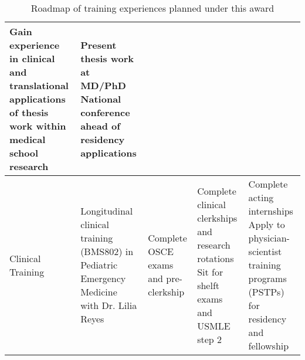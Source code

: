 \begin{table}[h]
\begin{tabularx}{\textwidth}{|l|X|X|X|X|}
    Gain experience in clinical and translational applications of thesis work within medical school research &
    Present thesis work at MD/PhD National conference ahead of residency applications \\
    \hline
    Clinical Training &
    Longitudinal clinical training (BMS802) in Pediatric Emergency Medicine with Dr. Lilia Reyes &
    Complete OSCE exams and pre-clerkship &
    Complete clinical clerkships and research rotations \newline
    Sit for shelft exams and USMLE step 2 &
    Complete acting internships \newline Apply to physician-scientist training programs (PSTPs) for residency and fellowship\\
  \hline

\end{tabularx}
\caption{Roadmap of training experiences planned under this award}
\label{tab:goals}
\end{table}
